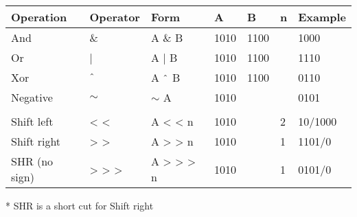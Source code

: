 \documentclass[
  11pt, %
  xcolor=dvipsnames
]{beamer}
\begin{document}
\begin{frame}[fragile]


	\begin{columns}[c]
		\begin{column}{0.98\textwidth}

			\begin{table}
				\begin{tabular}{l l l l l l l}
					\toprule
					Operation     & Operator   & Form           & A    & B    & n & Example \\
					\midrule
					And           & \&         & A \& B         & 1010 & 1100 &   & 1000    \\
					Or            & |          & A | B          & 1010 & 1100 &   & 1110    \\
					Xor           & $\string^$ & A $\string^$ B & 1010 & 1100 &   & 0110    \\
					Negative      & $\sim$     & $\sim$ A       & 1010 &      &   & 0101    \\
					              &            &                &                           \\
					Shift left    & < <        & A < < n        & 1010 &      & 2 & 10/1000 \\
					Shift right   & > >        & A > > n        & 1010 &      & 1 & 1101/0  \\
					SHR (no sign) & > > >      & A > > > n      & 1010 &      & 1 & 0101/0  \\
					\bottomrule
				\end{tabular}
			\end{table}
			* SHR is a short cut for Shift right

		\end{column}
	\end{columns}

\end{frame}


\end{document}
